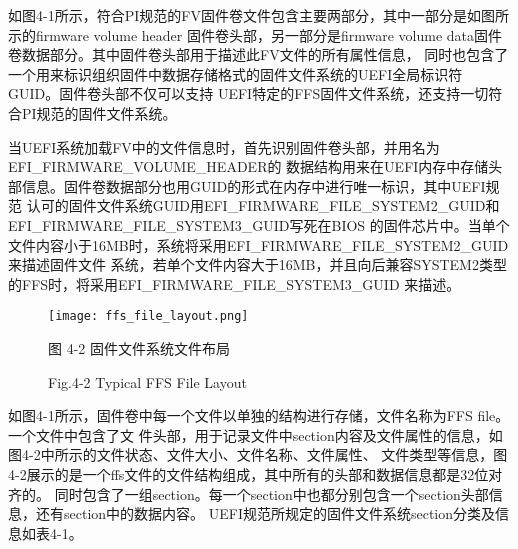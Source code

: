 如图4-1所示，符合PI规范的FV固件卷文件包含主要两部分，其中一部分是如图所示的firmware volume header
固件卷头部，另一部分是firmware volume data固件卷数据部分。其中固件卷头部用于描述此FV文件的所有属性信息，
同时也包含了一个用来标识组织固件中数据存储格式的固件文件系统的UEFI全局标识符GUID。固件卷头部不仅可以支持
UEFI特定的FFS固件文件系统，还支持一切符合PI规范的固件文件系统。
\par 当UEFI系统加载FV中的文件信息时，首先识别固件卷头部，并用名为EFI\_FIRMWARE\_VOLUME\_HEADER的
数据结构用来在UEFI内存中存储头部信息。固件卷数据部分也用GUID的形式在内存中进行唯一标识，其中UEFI规范
认可的固件文件系统GUID用EFI\_FIRMWARE\_FILE\_SYSTEM2\_GUID和EFI\_FIRMWARE\_FILE\_SYSTEM3\_GUID写死在BIOS
的固件芯片中。当单个文件内容小于16MB时，系统将采用EFI\_FIRMWARE\_FILE\_SYSTEM2\_GUID来描述固件文件
系统，若单个文件内容大于16MB，并且向后兼容SYSTEM2类型的FFS时，将采用EFI\_FIRMWARE\_FILE\_SYSTEM3\_GUID
来描述。

\begin{figure}[htb]
    \vspace{0cm}   
    \setlength{\abovecaptionskip}{0.3cm}
	\centering
    \texttt{[image: ffs\_file\_layout.png]}
    \caption*{图 4-2 固件文件系统文件布局}
    \setlength{\belowcaptionskip}{-0.5cm}
    \caption*{Fig.4-2 Typical FFS File Layout}
\end{figure}

\par 如图4-1所示，固件卷中每一个文件以单独的结构进行存储，文件名称为FFS file。一个文件中包含了文
件头部，用于记录文件中section内容及文件属性的信息，如图4-2中所示的文件状态、文件大小、文件名称、文件属性、
文件类型等信息，图4-2展示的是一个ffs文件的文件结构组成，其中所有的头部和数据信息都是32位对齐的。
同时包含了一组section。每一个section中也都分别包含一个section头部信息，还有section中的数据内容。
UEFI规范所规定的固件文件系统section分类及信息如表4-1。

